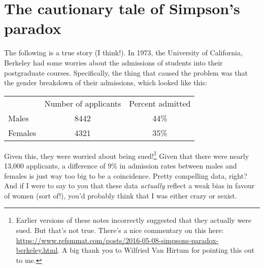 \section{The cautionary tale of Simpson's paradox}



The following is a true story (I think!). In 1973, the University of California, Berkeley had some worries about the admissions of students into their postgraduate courses. Specifically, the thing that caused the problem was that the gender breakdown of their admissions, which looked like this:
\begin{center}
\begin{tabular}{lcc}
& Number of applicants & Percent admitted \\
Males & 8442 & 44\% \\
Females & 4321 & 35\%  \\
\end{tabular}
\end{center}
Given this, they were worried about being sued!\footnote{Earlier versions of these notes incorrectly suggested that they actually were sued. But that's not true. There's a nice commentary on this here: \url{https://www.refsmmat.com/posts/2016-05-08-simpsons-paradox-berkeley.html}. A big thank you to Wilfried Van Hirtum for pointing this out to me.} Given that there were nearly 13,000 applicants, a difference of 9\% in admission rates between males and females is just way too big to be a coincidence. Pretty compelling data, right? And if I were to say to you that these data {\it actually} reflect a weak bias in favour of women (sort of!), you'd probably think that I was either crazy or sexist. 


